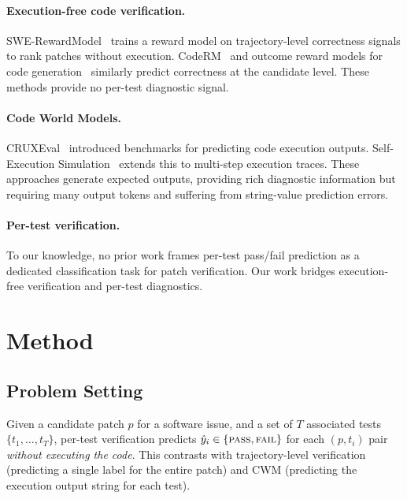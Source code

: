 \documentclass[11pt,a4paper]{article}
\begin{document}
\paragraph{Execution-free code verification.}
SWE-RewardModel~\cite{zhang2025swerm} trains a reward model on trajectory-level correctness signals to rank patches without execution.
CodeRM~\cite{shi2024coderm} and outcome reward models for code generation~\cite{li2025coderm} similarly predict correctness at the candidate level.
These methods provide no per-test diagnostic signal.

\paragraph{Code World Models.}
CRUXEval~\cite{gu2024cruxeval} introduced benchmarks for predicting code execution outputs.
Self-Execution Simulation~\cite{ni2024selfexec} extends this to multi-step execution traces.
These approaches generate expected outputs, providing rich diagnostic information but requiring many output tokens and suffering from string-value prediction errors.

\paragraph{Per-test verification.}
To our knowledge, no prior work frames per-test pass/fail prediction as a dedicated classification task for patch verification.
Our work bridges execution-free verification and per-test diagnostics.

\section{Method}

\subsection{Problem Setting}

Given a candidate patch $p$ for a software issue, and a set of $T$ associated tests $\{t_1,\ldots,t_T\}$, per-test verification predicts $\hat{y}_i \in \{\textsc{pass}, \textsc{fail}\}$ for each $(p, t_i)$ pair \emph{without executing the code}.
This contrasts with trajectory-level verification (predicting a single label for the entire patch) and CWM (predicting the execution output string for each test).
\end{document}
